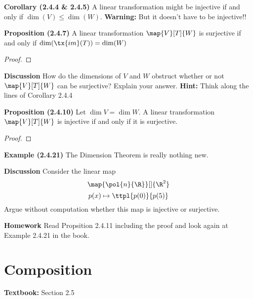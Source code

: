 \documentclass[letterpaper, 10pt]{article}
\begin{document}
\vspace{200pt}
\lb
\textbf{Corollary (2.4.4 \& 2.4.5)}
\lb
A linear transformation might be injective if and only if $\dim(V) \leq \dim(W)$.
\pr
\textbf{Warning:} But it doesn't have to be injective!!




\vspace{200pt}
\lb
\textbf{Proposition (2.4.7)}
\lb
A linear transformation $ \map{V}[T]{W} $ is surjective if and only if
$\dim(\tx{im}(T)) = \dim(W)$
\begin{proof}
\end{proof}






\newpage
\lb
\textbf{Discussion}
\lb
How do the dimensions of $V$ and $W$ obstruct whether or not $\map{V}[T]{W}$
can be surjective? Explain your answer.
\pr
\textbf{Hint: } Think along the lines of Corollary 2.4.4





\vspace{200pt}
\lb
\textbf{Proposition (2.4.10)}
\lb
Let $\dim{V} = \dim{W}$. A linear transformation $\map{V}[T]{W}$ is injective
if and only if it is surjective.
\begin{proof}
\end{proof}


\vspace{200pt}
\lb
\textbf{Example (2.4.21)}
\lb
The Dimension Theorem is really nothing new.





\newpage
\vspace{200pt}
\lb
\textbf{Discussion}
\lb
Consider the linear map
\[ \map{\pol{n}{\R}}[]{\R^2} \]
\[ p(x) \mapsto \ttpl{p(0)}{p(5)} \]
Argue without computation whether this map is injective or surjective.






\vspace{200pt}
\lb
\textbf{Homework}
\lb
Read Propsition 2.4.11 including the proof and look again at Example 2.4.21 in the book.






\newpage
\section*{Composition}%
\textbf{Textbook:} Section 2.5
\end{document}
